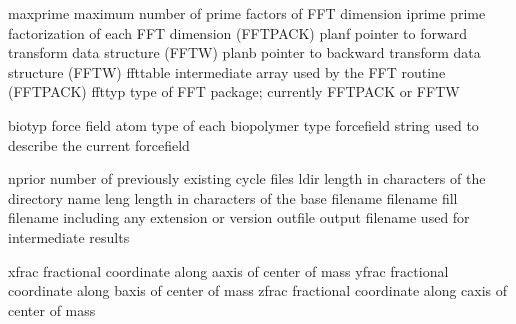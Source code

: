 \documentclass[letterpaper,11pt,english]{sphinxmanual}
\begin{document}
\sphinxAtStartPar
{}

\begin{sphinxVerbatim}[commandchars=\\\{\}]
maxprime        maximum number of prime factors of FFT dimension
iprime          prime factorization of each FFT dimension (FFTPACK)
planf           pointer to forward transform data structure (FFTW)
planb           pointer to backward transform data structure (FFTW)
ffttable        intermediate array used by the FFT routine (FFTPACK)
ffttyp          type of FFT package; currently FFTPACK or FFTW
\end{sphinxVerbatim}

\sphinxAtStartPar
{}

\begin{sphinxVerbatim}[commandchars=\\\{\}]
biotyp          force field atom type of each biopolymer type
forcefield      string used to describe the current forcefield
\end{sphinxVerbatim}

\sphinxAtStartPar
{}

\begin{sphinxVerbatim}[commandchars=\\\{\}]
nprior          number of previously existing cycle files
ldir            length in characters of the directory name
leng            length in characters of the base filename
filename        fill filename including any extension or version
outfile         output filename used for intermediate results
\end{sphinxVerbatim}

\sphinxAtStartPar
{}

\begin{sphinxVerbatim}[commandchars=\\\{\}]
xfrac           fractional coordinate along a\PYGZhy{}axis of center of mass
yfrac           fractional coordinate along b\PYGZhy{}axis of center of mass
zfrac           fractional coordinate along c\PYGZhy{}axis of center of mass
\end{sphinxVerbatim}

\sphinxAtStartPar
{}
\end{document}
